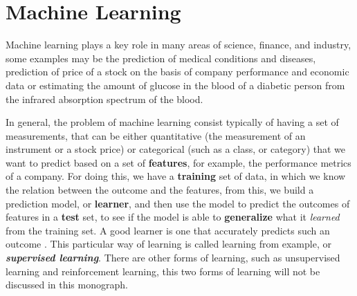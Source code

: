 \section{Machine Learning}
Machine learning plays a key role in many areas of science, finance, and industry, some examples may be the prediction of medical conditions and diseases, prediction of price of a stock on the basis of company performance and economic data or estimating the amount of glucose in the blood of a diabetic person from the infrared absorption spectrum of the blood.

In general, the problem of machine learning consist typically of having a set of measurements, that can be either quantitative (the measurement of an instrument or a stock price) or categorical (such as a class, or category) that we want to predict based on a set of \textbf{features}, for example, the performance metrics of a company. For doing this, we have a \textbf{training} set of data, in which we know the relation between the outcome and the features, from this, we build a prediction model, or \textbf{learner}, and then use the model to predict the outcomes of features in a \textbf{test} set, to see if the model is able to \textbf{generalize} what it \textit{learned} from the training set. A good learner is one that accurately predicts such an outcome \cite{Hastie2009}. This particular way of learning is called learning from example, or \textit{\textbf{supervised learning}}. There are other forms of learning, such as unsupervised learning and reinforcement learning, this two forms of learning will not be discussed in this monograph.

